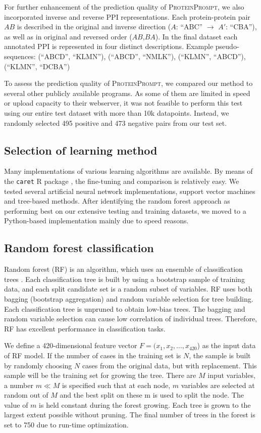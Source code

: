 \documentclass{bioinfo}
\newcommand{\tool}{\textsc{ProteinPrompt}}
\begin{document}
For further enhancement of the prediction
quality of \tool, we also incorporated inverse and reverse PPI
representations. Each protein-protein pair $AB$ is described in the
original and inverse direction ($A$: ``ABC'' $\rightarrow$ $A'$:  ``CBA''),
as well as in original and reversed order ($AB$,$BA$).
In the final dataset each annotated PPI is represented
in four distinct descriptions. Example pseudo-sequences: (``ABCD'', ``KLMN''),
  (``ABCD'', ``NMLK''), (``KLMN'', ``ABCD''), (``KLMN'', ``DCBA'')

To assess the prediction quality of \tool, we compared our method to
several other publicly available programs. As some of them are limited
in speed or upload capacity to their webserver, it was not
feasible to perform this test using our entire test dataset with more
than 10k datapoints. Instead, we randomly selected 495 positive and 473
negative pairs from our test set.


\subsection{Selection of learning method}
Many implementations of various learning algorithms are
available. By means of the \texttt{caret} R package \citep{Kuhn:2008},
the fine-tuning and comparison is relatively easy. We tested several
artificial neural network implementations, support vector machines and
tree-based methods. After identifying the random forest approach as
performing best on our extensive testing and training datasets,
we moved to a Python-based implementation mainly
due to speed reasons.  


\subsection{Random forest classification}
Random forest (RF) is an algorithm, which uses an ensemble of
classification trees \citep{Breiman:2001}. Each classification tree is built by using a
bootstrap sample of training data, and each split candidate set is a
random subset of variables. RF uses both bagging (bootstrap
aggregation) and random variable selection for tree building. Each
classification tree is unpruned to obtain low-bias trees. The bagging
and random variable selection can cause low correlation of individual
trees. Therefore, RF has excellent performance in classification
tasks. 

We define a 420-dimensional feature vector $F=(x_1,x_2,
\dots,x_{420}$) as the input data of RF model. If the number of cases
in the training set is $N$, the sample is built by randomly choosing
$N$ cases from the original data, but with replacement. This sample
will be the training set for growing the tree. There are $M$ input
variables, a number $m \ll M$ is specified such that at each node, $m$
variables are selected at random out of $M$ and the best split on
these m is used to split the node. The value of $m$ is held constant
during the forest growing. Each tree is grown to the largest extent
possible without pruning. The final number of trees in the forest is
set to 750 due to run-time optimization. 
\end{document}
